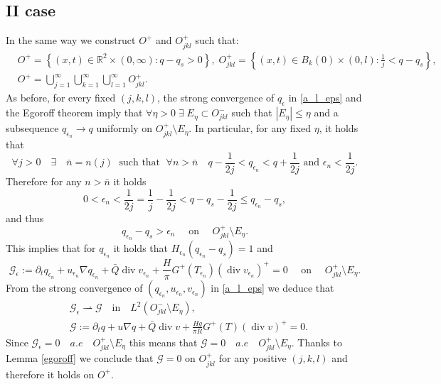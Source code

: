 \documentclass[11pt, a4paper, article,reqno,]{amsart}
\theoremstyle{remark}
\DeclareMathOperator{\dive}{div}
\numberwithin{equation}{section}
\begin{document}
\subsection*{II case}
In the same way we construct $O^+$ and $O_{jkl}^+$ such that:
\begin{equation*}
    \begin{aligned}
        & O^+ = \left\{ (x,t) \in \mathbb{R}^2 \times (0, \infty): q-q_s > 0\right \}, \;  O_{jkl}^+ = \left\{ (x,t) \in B_k(0) \times (0,l) : \frac{1}{j} < q-q_s\right \}, \\
        &O^+ = \bigcup_{j= 1}^{\infty} \bigcup_{k= 1}^{\infty} \bigcup_{l= 1}^{\infty} O_{jkl}^+.
    \end{aligned}
\end{equation*}
As before, for every fixed $(j,k,l)$, the strong convergence of $q_\epsilon$ in \eqref{a_l_eps} and the Egoroff theorem imply that $\forall \eta > 0 \; \exists \; E_{\eta} \subset O_{jkl}^-$  such that $|E_{\eta}| \leq \eta$ and a subsequence $q_{\epsilon_n} \rightarrow q$ uniformly on $O_{jkl}^+ \setminus E_{\eta}$. In particular, for any fixed $\eta$, it holds that 
\begin{equation*}
    \forall j>0 \quad \exists \quad \bar{n} = n(j) \; \text{ such that }\; \forall n > \bar{n} \quad q -\frac{1}{2j} < q_{\epsilon_n} < q +\frac{1}{2j}\mbox{ and }\epsilon_n<\frac{1}{2j}.
\end{equation*}
Therefore for any $n>\bar{n}$ it holds
\begin{equation*}
    0 < \epsilon_n < \frac{1}{2j}=\frac{1}{j}- \frac{1}{2j} < q - q_s - \frac{1}{2j} \leq q_{\epsilon_n} - q_s,
\end{equation*}
and thus
\begin{equation*}
    q_{\epsilon_n} - q_s > \epsilon_n \quad \text{ on } \quad O_{jkl}^+ \setminus E_{\eta}.
\end{equation*}
This implies that for $q_{\epsilon_n}$ it holds that $H_{{\epsilon}_n}(q_{\epsilon_n} -q_s)=1$ and
\begin{equation*}
    \mathcal{G_\epsilon}:= \partial_t q_{\epsilon_n} + u_{\epsilon_n} \nabla q_{\epsilon_n} + \bar{Q} \dive v_{\epsilon_n} + \frac{H}{\pi} G^+(T_{\epsilon_n})( \dive v_{\epsilon_n})^+= 0 \quad \text{ on } \quad O_{jkl}^+ \setminus E_{\eta}.
\end{equation*}
From the strong convergence of $(q_{\epsilon_n}, u_{\epsilon_n}, v_{\epsilon_n})$ in \eqref{a_l_eps} we deduce that
\begin{equation*}
\begin{aligned}
    &\mathcal{G_\epsilon} \overset{}{\rightharpoonup} \mathcal{G} \quad \text{in} \quad L^2( O_{jkl}^- \setminus E_{\eta}), \\
    & \mathcal{G}:= \partial_t q + u \nabla q + \bar{Q} \dive v + \frac{H g}{\pi R} G^+(T)( \dive v)^+=0.
\end{aligned}
\end{equation*}
Since $\mathcal{G_\epsilon} = 0 \quad  a.e \quad  O_{jkl}^+ \setminus E_{\eta}$ this means that $\mathcal{G} = 0 \quad  a.e \quad  O_{jkl}^+ \setminus E_{\eta}$. Thanks to Lemma \ref{egoroff} we conclude that $\mathcal{G}=0$ on $O_{jkl}^+$ for any positive $(j,k,l)$ and therefore it holds on $O^{+}$.
\end{document}
